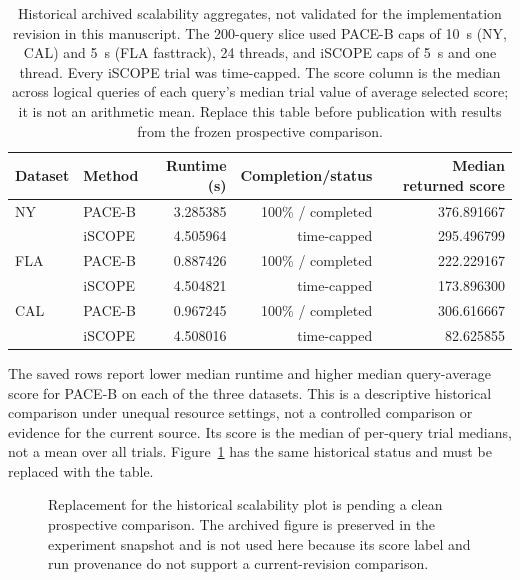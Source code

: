 \documentclass[a4paper,fleqn]{cas-dc}
\begin{document}
\begin{table}[t]
\centering
\caption{Historical archived scalability aggregates, not validated for the implementation revision in this manuscript. The 200-query slice used PACE-B caps of 10~s (NY, CAL) and 5~s (FLA fasttrack), 24 threads, and iSCOPE caps of 5~s and one thread. Every iSCOPE trial was time-capped. The score column is the median across logical queries of each query's median trial value of average selected score; it is not an arithmetic mean. Replace this table before publication with results from the frozen prospective comparison.}
\label{tab:scalability_main}
\scriptsize
\setlength{\tabcolsep}{5pt}
\begin{tabular}{@{}llrrr@{}}
\toprule
\textbf{Dataset} & \textbf{Method} & \textbf{Runtime (s)} & \textbf{Completion/status} & \textbf{Median returned score} \\
\midrule
NY  & PACE-B & 3.285385 & 100\% / completed & 376.891667 \\
    & iSCOPE & 4.505964 & time-capped & 295.496799 \\
\midrule
FLA & PACE-B & 0.887426 & 100\% / completed & 222.229167 \\
    & iSCOPE & 4.504821 & time-capped & 173.896300 \\
\midrule
CAL & PACE-B & 0.967245 & 100\% / completed & 306.616667 \\
    & iSCOPE & 4.508016 & time-capped & 82.625855 \\
\bottomrule
\end{tabular}
\end{table}

The saved rows report lower median runtime and higher median query-average score for PACE-B on each of the three datasets. This is a descriptive historical comparison under unequal resource settings, not a controlled comparison or evidence for the current source. Its score is the median of per-query trial medians, not a mean over all trials. Figure~\ref{fig:scalability_main} has the same historical status and must be replaced with the table.

\begin{figure}[H]
\centering
{}
\caption{Replacement for the historical scalability plot is pending a clean prospective comparison. The archived figure is preserved in the experiment snapshot and is not used here because its score label and run provenance do not support a current-revision comparison.}
\label{fig:scalability_main}
\end{figure}
\end{document}

